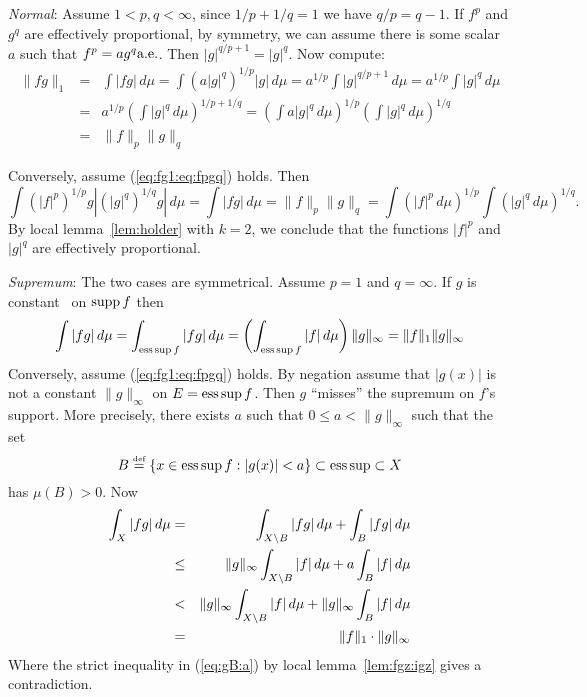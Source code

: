 \begin{enumerate}
\begin{itemize}
  \emph{Normal}: Assume \(1<p,q<\infty\),
  since \(1/p+1/q=1\) we have
  \(q/p = q - 1\).
  If \(f^p\) and \(g^q\) are effectively proportional, by symmetry, we can assume
  there is some scalar $a$ such that \(f^p = a g^q \textrm{a.e.}\). Then
  \(|g|^{q/p+1} = |g|^q\). Now compute:
 \begin{eqnarray*}
  \|fg\|_1
    &=& \int |fg|\,d\mu
    = \int (a|g|^q)^{1/p}|g|\,d\mu
    = a^{1/p} \int |g|^{q/p+1}\,d\mu
    = a^{1/p} \int |g|^q\,d\mu \\
    &=& a^{1/p} \left(\int |g|^q\,d\mu\right)^{1/p + 1/q}
    = \left(\int a|g|^q\,d\mu\right)^{1/p}
      \left(\int  |g|^q\,d\mu\right)^{1/q} \\
    &=& \|f\|_p \|g\|_q
 \end{eqnarray*}

 Conversely, assume (\ref{eq:fg1:eq:fpgq}) holds. Then
 \begin{equation*}
 \int \left(|f|^p\right)^{1/p}g|
      \left(|g|^q\right)^{1/q}g|
        \,d\mu
 = \int |fg|\,d\mu
 = \|f\|_p \|g\|_q
 = \int \left(|f|^p\,d\mu\right)^{1/p}
   \int \left(|g|^q\,d\mu\right)^{1/q}.
 \end{equation*}
 By local lemma~\ref{lem:holder}
 with \(k=2\), we conclude that the functions \(|f|^p\) and \(|g|^q\)
 are effectively proportional.

 \medskip
 \emph{Supremum}: The two cases are symmetrical.
 Assume \(p=1\) and \(q=\infty\).
 If $g$ is constant \aded\ on \(\mathop{\rm supp}\nolimits f\) then
 \begin{equation*}
 \int |fg|\,d\mu = \int_{\operatorname*{ess\,sup} f} |fg|\,d\mu
 = \left(\int_{\operatorname*{ess\,sup} f} |f|\,d\mu\right)\|g\|_\infty
 = \|f\|_1 \|g\|_\infty
 \end{equation*}
 Conversely, assume (\ref{eq:fg1:eq:fpgq}) holds. By negation
 assume that \(|g(x)|\) is not a constant \(\|g\|_\infty\) on \(E=\operatorname*{ess\,sup} f\).
 Then $g$ ``misses'' the supremum on $f$'s support. More precisely,
 there exists $a$ such that \(0\leq a < \|g\|_\infty\)
 such that the set
 \begin{equation*}
  B \stackrel{\mbox{\upshape\tiny def}}{=} \{x\in \operatorname*{ess\,sup} f: |g(x)| < a\} \subset \operatorname*{ess\,sup} \subset X
 \end{equation*}
 has \(\mu(B)> 0\). Now
 \begin{eqnarray}
 \int_X |fg|\,d\mu
 &=&    \notag
         \int_{X\setminus B} |fg|\,d\mu + \int_B |fg|\,d\mu \\
 &\leq& \notag
          \|g\|_\infty \int_{X\setminus B} |f|\,d\mu
        + a \int_B |f|\,d\mu \\
 &<&    \label{eq:gB:a}
          \|g\|_\infty \int_{X\setminus B} |f|\,d\mu
        + \|g\|_\infty \int_B |f|\,d\mu \\
 &=&    \notag
        \|f\|_1 \cdot \|g\|_\infty
 \end{eqnarray}
 Where the strict inequality in (\ref{eq:gB:a})
 by local lemma~\ref{lem:fgz:igz} gives a contradiction.


\end{itemize}
\end{enumerate}
